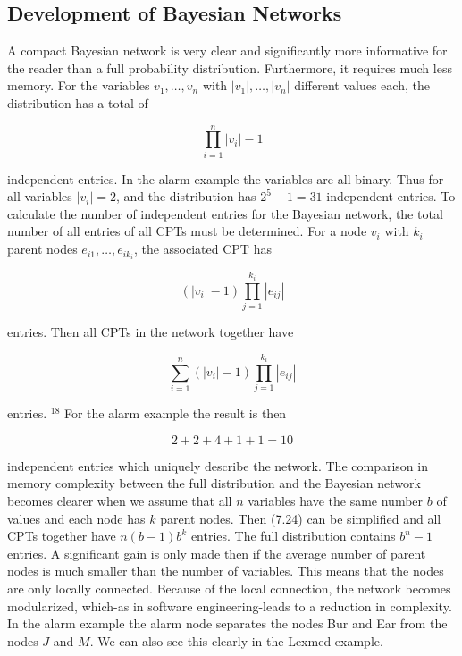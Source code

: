 \documentclass[10pt]{book}
\begin{document}
\subsection{Development of Bayesian Networks}
A compact Bayesian network is very clear and significantly more informative for the reader than a full probability distribution. Furthermore, it requires much less memory. For the variables $v_{1}, \ldots, v_{n}$ with $\left|v_{1}\right|, \ldots,\left|v_{n}\right|$ different values each, the distribution has a total of

$$
\prod_{i=1}^{n}\left|v_{i}\right|-1
$$

independent entries. In the alarm example the variables are all binary. Thus for all variables $\left|v_{i}\right|=2$, and the distribution has $2^{5}-1=31$ independent entries. To calculate the number of independent entries for the Bayesian network, the total number of all entries of all CPTs must be determined. For a node $v_{i}$ with $k_{i}$ parent nodes $e_{i 1}, \ldots, e_{i k_{i}}$, the associated CPT has

$$
\left(\left|v_{i}\right|-1\right) \prod_{j=1}^{k_{i}}\left|e_{i j}\right|
$$

entries. Then all CPTs in the network together have


\begin{equation*}
\sum_{i=1}^{n}\left(\left|v_{i}\right|-1\right) \prod_{j=1}^{k_{i}}\left|e_{i j}\right| \tag{7.24}
\end{equation*}


entries. ${ }^{18}$ For the alarm example the result is then

$$
2+2+4+1+1=10
$$

independent entries which uniquely describe the network. The comparison in memory complexity between the full distribution and the Bayesian network becomes clearer when we assume that all $n$ variables have the same number $b$ of values and each node has $k$ parent nodes. Then (7.24) can be simplified and all CPTs together have $n(b-1) b^{k}$ entries. The full distribution contains $b^{n}-1$ entries. A significant gain is only made then if the average number of parent nodes is much smaller than the number of variables. This means that the nodes are only locally connected. Because of the local connection, the network becomes modularized, which-as in software engineering-leads to a reduction in complexity. In the alarm example the alarm node separates the nodes Bur and Ear from the nodes $J$ and $M$. We can also see this clearly in the Lexmed example.
\end{document}
